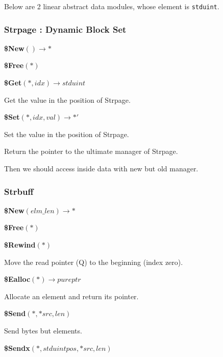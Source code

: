 Below are 2 linear abstract data modules, whose element is \verb|stduint|.





\subsubsection{Strpage : Dynamic Block Set}

\textbf{\$New}$() \rightarrow *$



\textbf{\$Free}$(*)$



\textbf{\$Get}$(*, idx) \rightarrow stduint$



Get the value in the position of Strpage.



\textbf{\$Set}$(*, idx, val) \rightarrow *'$



Set the value in the position of Strpage.

Return the pointer to the ultimate manager of Strpage.

Then we should access inside data with new but old manager.





\subsubsection{Strbuff}

\textbf{\$New}$(elm\_len) \rightarrow *$



\textbf{\$Free}$(*)$



\textbf{\$Rewind}$(*)$



Move the read pointer (Q) to the beginning (index zero).



\textbf{\$Ealloc}$(*) \rightarrow pureptr$



Allocate an element and return its pointer.



\textbf{\$Send}$(*, *src, len)$



Send bytes but elements.



\textbf{\$Sendx}$(*, stduint pos, *src, len)$



